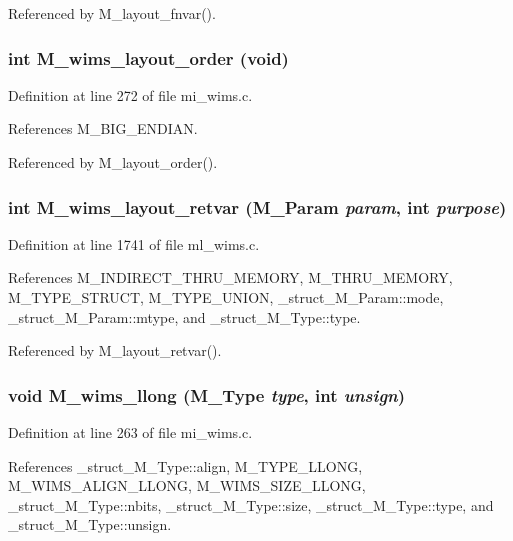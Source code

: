 Referenced by M\_\-layout\_\-fnvar().
\subsubsection{\setlength{\rightskip}{0pt plus 5cm}int M\_\-wims\_\-layout\_\-order (void)}\label{m__wims_8h_f5d4960a79cf363b1bb7cf42e943db3e}




Definition at line 272 of file mi\_\-wims.c.

References M\_\-BIG\_\-ENDIAN.

Referenced by M\_\-layout\_\-order().
\subsubsection{\setlength{\rightskip}{0pt plus 5cm}int M\_\-wims\_\-layout\_\-retvar (\bf{M\_\-Param} {\em param}, int {\em purpose})}\label{m__wims_8h_37808766c8dda87bcefdc1ff2485fb03}




Definition at line 1741 of file ml\_\-wims.c.

References M\_\-INDIRECT\_\-THRU\_\-MEMORY, M\_\-THRU\_\-MEMORY, M\_\-TYPE\_\-STRUCT, M\_\-TYPE\_\-UNION, \_\-struct\_\-M\_\-Param::mode, \_\-struct\_\-M\_\-Param::mtype, and \_\-struct\_\-M\_\-Type::type.

Referenced by M\_\-layout\_\-retvar().
\subsubsection{\setlength{\rightskip}{0pt plus 5cm}void M\_\-wims\_\-llong (\bf{M\_\-Type} {\em type}, int {\em unsign})}\label{m__wims_8h_be4633981c044f2a53f6103feed664ee}




Definition at line 263 of file mi\_\-wims.c.

References \_\-struct\_\-M\_\-Type::align, M\_\-TYPE\_\-LLONG, M\_\-WIMS\_\-ALIGN\_\-LLONG, M\_\-WIMS\_\-SIZE\_\-LLONG, \_\-struct\_\-M\_\-Type::nbits, \_\-struct\_\-M\_\-Type::size, \_\-struct\_\-M\_\-Type::type, and \_\-struct\_\-M\_\-Type::unsign.


